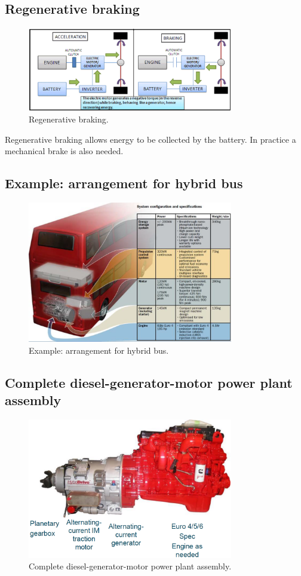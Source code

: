 \subsection{Regenerative braking}
\begin{figure}[H]
    \centering
    \includegraphics[width = 0.8\textwidth]{img/figure101.png}
    \caption{Regenerative braking.}
\end{figure}
Regenerative braking allows energy to be collected by the battery. In practice a mechanical brake is also needed.
\subsection{Example: arrangement for hybrid bus}
\begin{figure}[H]
    \centering
    \includegraphics[width = 0.8\textwidth]{img/figure102.png}
    \caption{Example: arrangement for hybrid bus.}
\end{figure}
\subsection{Complete diesel-generator-motor power plant assembly}
\begin{figure}[H]
    \centering
    \includegraphics[width = 0.8\textwidth]{img/figure103.png}
    \caption{Complete diesel-generator-motor power plant assembly.}
\end{figure}
